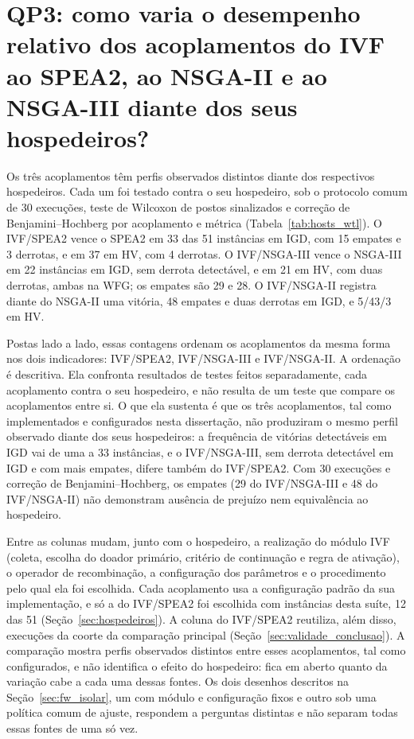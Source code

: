 \section{QP3: como varia o desempenho relativo dos acoplamentos do IVF ao SPEA2, ao NSGA-II e ao NSGA-III diante dos seus hospedeiros?}
\label{sec:resposta_qp3}

Os três acoplamentos têm perfis observados distintos diante dos respectivos hospedeiros. Cada um foi testado contra o seu hospedeiro, sob o protocolo comum de 30 execuções, teste de Wilcoxon de postos sinalizados e correção de Benjamini--Hochberg por acoplamento e métrica (Tabela~\ref{tab:hosts_wtl}). O IVF/SPEA2 vence o SPEA2 em 33 das 51 instâncias em IGD, com 15 empates e 3 derrotas, e em 37 em HV, com 4 derrotas. O IVF/NSGA-III vence o NSGA-III em 22 instâncias em IGD, sem derrota detectável, e em 21 em HV, com duas derrotas, ambas na WFG; os empates são 29 e 28. O IVF/NSGA-II registra diante do NSGA-II uma vitória, 48 empates e duas derrotas em IGD, e 5/43/3 em HV.

Postas lado a lado, essas contagens ordenam os acoplamentos da mesma forma nos dois indicadores: IVF/SPEA2, IVF/NSGA-III e IVF/NSGA-II. A ordenação é descritiva. Ela confronta resultados de testes feitos separadamente, cada acoplamento contra o seu hospedeiro, e não resulta de um teste que compare os acoplamentos entre si. O que ela sustenta é que os três acoplamentos, tal como implementados e configurados nesta dissertação, não produziram o mesmo perfil observado diante dos seus hospedeiros: a frequência de vitórias detectáveis em IGD vai de uma a 33 instâncias, e o IVF/NSGA-III, sem derrota detectável em IGD e com mais empates, difere também do IVF/SPEA2. Com 30 execuções e correção de Benjamini--Hochberg, os empates (29 do IVF/NSGA-III e 48 do IVF/NSGA-II) não demonstram ausência de prejuízo nem equivalência ao hospedeiro.

Entre as colunas mudam, junto com o hospedeiro, a realização do módulo IVF (coleta, escolha do doador primário, critério de continuação e regra de ativação), o operador de recombinação, a configuração dos parâmetros e o procedimento pelo qual ela foi escolhida. Cada acoplamento usa a configuração padrão da sua implementação, e só a do IVF/SPEA2 foi escolhida com instâncias desta suíte, 12 das 51 (Seção~\ref{sec:hospedeiros}). A coluna do IVF/SPEA2 reutiliza, além disso, execuções da coorte da comparação principal (Seção~\ref{sec:validade_conclusao}). A comparação mostra perfis observados distintos entre esses acoplamentos, tal como configurados, e não identifica o efeito do hospedeiro: fica em aberto quanto da variação cabe a cada uma dessas fontes. Os dois desenhos descritos na Seção~\ref{sec:fw_isolar}, um com módulo e configuração fixos e outro sob uma política comum de ajuste, respondem a perguntas distintas e não separam todas essas fontes de uma só vez.

